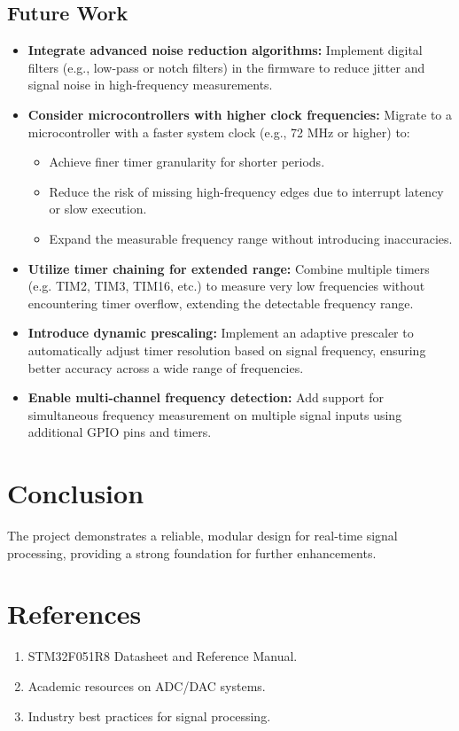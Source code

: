 \documentclass[12pt]{article}
\begin{document}
\subsection{Future Work}
\begin{itemize}[leftmargin=2em]
    \item \textbf{Integrate advanced noise reduction algorithms:} Implement digital filters (e.g., low-pass or notch filters) in the firmware to reduce jitter and signal noise in high-frequency measurements.

    \item \textbf{Consider microcontrollers with higher clock frequencies:} Migrate to a microcontroller with a faster system clock (e.g., 72 MHz or higher) to:
    \begin{itemize}[leftmargin=2em]
        \item Achieve finer timer granularity for shorter periods.
        \item Reduce the risk of missing high-frequency edges due to interrupt latency or slow execution.
        \item Expand the measurable frequency range without introducing inaccuracies.
    \end{itemize}

    \item \textbf{Utilize timer chaining for extended range:} Combine multiple timers (e.g. TIM2, TIM3, TIM16, etc.) to measure very low frequencies without encountering timer overflow, extending the detectable frequency range.

    \item \textbf{Introduce dynamic prescaling:} Implement an adaptive prescaler to automatically adjust timer resolution based on signal frequency, ensuring better accuracy across a wide range of frequencies.


    \item \textbf{Enable multi-channel frequency detection:} Add support for simultaneous frequency measurement on multiple signal inputs using additional GPIO pins and timers.


\end{itemize}

\section{Conclusion}
The project demonstrates a reliable, modular design for real-time signal processing, providing a strong foundation for further enhancements.

\section{References}
\begin{enumerate}[leftmargin=2em]
    \item STM32F051R8 Datasheet and Reference Manual.
    \item Academic resources on ADC/DAC systems.
    \item Industry best practices for signal processing.
\end{enumerate}
\end{document}
